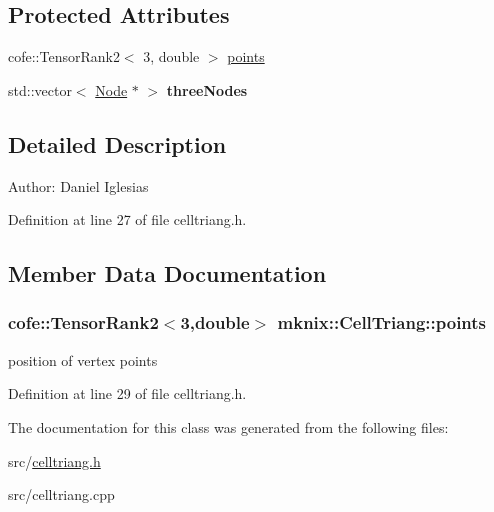 \subsection*{Protected Attributes}
\begin{CompactItemize}
\item 
cofe::TensorRank2$<$ 3, double $>$ \hyperlink{classmknix_1_1CellTriang_6f3e6ae0d06cbd4703c073e0860e38ed}{points}
\item 
\hypertarget{classmknix_1_1CellTriang_9e003f8d21f4f2a0f2f6d3212b751993}{
std::vector$<$ \hyperlink{classmknix_1_1Node}{Node} $\ast$ $>$ \textbf{threeNodes}}
\label{classmknix_1_1CellTriang_9e003f8d21f4f2a0f2f6d3212b751993}

\end{CompactItemize}


\subsection{Detailed Description}
\begin{Desc}
\item[Author:]Daniel Iglesias \end{Desc}


Definition at line 27 of file celltriang.h.

\subsection{Member Data Documentation}
\hypertarget{classmknix_1_1CellTriang_6f3e6ae0d06cbd4703c073e0860e38ed}{
\subsubsection{\setlength{\rightskip}{0pt plus 5cm}cofe::TensorRank2$<$3,double$>$ {\bf mknix::CellTriang::points}}}
\label{classmknix_1_1CellTriang_6f3e6ae0d06cbd4703c073e0860e38ed}


position of vertex points 

Definition at line 29 of file celltriang.h.

The documentation for this class was generated from the following files:\begin{CompactItemize}
\item 
src/\hyperlink{celltriang_8h}{celltriang.h}\item 
src/celltriang.cpp\end{CompactItemize}
